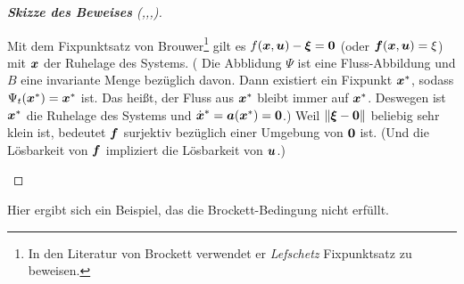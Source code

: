 \begin{proof}[\textbf{Skizze des Beweises} (\cite{brockett1983asymptotic},\cite{liberzon2012switching},\cite{khalil2002nonlinear},\cite{picci2012dynamical})]
\begin{enumerate}
		
		Mit dem Fixpunktsatz von Brouwer\footnote{In den Literatur von Brockett verwendet er \emph{Lefschetz} Fixpunktsatz zu beweisen.} gilt es $f(\boldsymbol x,\boldsymbol u)-\boldsymbol \xi=\boldsymbol 0$ (oder $\boldsymbol f(\boldsymbol x,\boldsymbol u)=\xi$) mit $\boldsymbol x$ der Ruhelage des Systems. ( Die Abblidung $\Psi$ ist eine Fluss-Abbildung und $B$ eine invariante Menge bezüglich davon. Dann existiert ein Fixpunkt $\boldsymbol x^{\ast}$, sodass $\Psi _{t}(\boldsymbol x^{\ast}) = \boldsymbol x^{\ast}$ ist. Das heißt, der Fluss aus $\boldsymbol x^{\ast}$ bleibt immer auf $\boldsymbol x^{\ast}$. Deswegen ist $\boldsymbol x^{\ast}$ die Ruhelage des Systems und $\dot{\boldsymbol x}^{\ast} = \boldsymbol a(\boldsymbol x^{\ast}) = \boldsymbol 0$.) Weil $\left \| \boldsymbol \xi -\boldsymbol 0\right \|$ beliebig sehr klein ist, bedeutet $\boldsymbol f$ surjektiv bezüglich einer Umgebung von $\boldsymbol 0$ ist. (Und die Lösbarkeit von  $\boldsymbol f$ impliziert die Lösbarkeit von $\boldsymbol u$.)
	\end{enumerate}
\end{proof} %

Hier ergibt sich ein Beispiel, das die Brockett-Bedingung nicht erfüllt.

